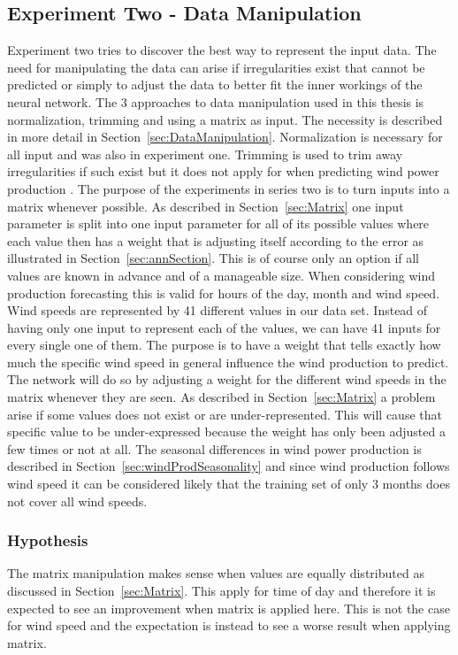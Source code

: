 \subsection{Experiment Two - Data Manipulation}
Experiment two tries to discover the best way to represent the input data. The need for manipulating the data can arise if irregularities exist that cannot be predicted or simply to adjust the data to better fit the inner workings of the neural network. The 3 approaches to data manipulation used in this thesis is normalization, trimming and using a matrix as input. The necessity is described in more detail in Section~\ref{sec:DataManipulation}. Normalization is necessary for all input and was also in experiment one. Trimming is used to trim away irregularities if such exist but it does not apply for when predicting wind power production . The purpose of the experiments in series two is to turn inputs into a matrix whenever possible. As described in Section~\ref{sec:Matrix} one input parameter is split into one input parameter for all of its possible values where each value then has a weight that is adjusting itself according to the error as illustrated in Section~\ref{sec:annSection}. This is of course only an option if all values are known in advance and of a manageable size. When considering wind production forecasting this is valid for hours of the day, month and wind speed. Wind speeds are represented by 41 different values in our data set. Instead of having only one input to represent each of the values, we can have 41 inputs for every single one of them. The purpose is to have a weight that tells exactly how much the specific wind speed in general influence the wind production to predict. The network will do so by adjusting a weight for the different wind speeds in the matrix whenever they are seen. As described in Section~\ref{sec:Matrix} a problem arise if some values does not exist or are under-represented. This will cause that specific value to be under-expressed because the weight has only been adjusted a few times or not at all. The seasonal differences in wind power production is described in Section~\ref{sec:windProdSeasonality} and since wind production follows wind speed it can be considered likely that the training set of only 3 months does not cover all wind speeds.

\subsubsection{Hypothesis} 
The matrix manipulation makes sense when values are equally distributed as discussed in Section~\ref{sec:Matrix}. This apply for time of day and therefore it is expected to see an improvement when matrix is applied here. This is not the case for wind speed and the expectation is instead to see a worse result when applying matrix.

